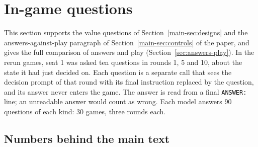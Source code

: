 \documentclass[10pt]{article}
\let\plainsubsection\subsection
\renewcommand{\subsection}{\FloatBarrier\needspace{8\baselineskip}\plainsubsection}
\let\plainsection\section
\renewcommand{\section}{\FloatBarrier\needspace{12\baselineskip}\plainsection}  %
\begin{document}
\begin{table}[h]
\caption{No hint against the rerun of the base prompt at $p=0.1$, $0.5$ and $0.9$ (30 games per model in each). $P$: permutation test permuting condition labels within each risk level; panel rows also permute within each model.}
\label{tab:nohint}
\centering\small

\end{table}

\section{In-game questions}
\label{sec:questions}

This section supports the value questions of Section~\ref{main-sec:designs} and the answers-against-play paragraph of Section~\ref{main-sec:controls} of the paper, and gives the full comparison of answers and play (Section~\ref{sec:answers-play}). In the rerun games, seat 1 was asked ten questions in rounds 1, 5 and 10, about the state it had just decided on. Each question is a separate call that sees the decision prompt of that round with its final instruction replaced by the question, and its answer never enters the game. The answer is read from a final \texttt{ANSWER:} line; an unreadable answer would count as wrong. Each model answers 90 questions of each kind: 30 games, three rounds each.

\subsection{Numbers behind the main text}
\end{document}
